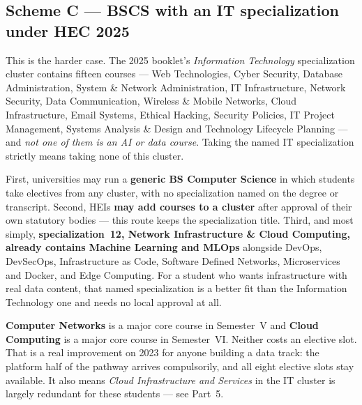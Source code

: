 \documentclass[11pt,a4paper,oneside]{report}
\begin{document}
\subsection{Scheme C --- BSCS with an IT specialization under HEC 2025}

This is the harder case. The 2025 booklet's \emph{Information Technology}
specialization cluster contains fifteen courses --- Web Technologies, Cyber
Security, Database Administration, System \& Network Administration, IT
Infrastructure, Network Security, Data Communication, Wireless \& Mobile
Networks, Cloud Infrastructure, Email Systems, Ethical Hacking, Security Policies,
IT Project Management, Systems Analysis \& Design and Technology Lifecycle
Planning --- and \emph{not one of them is an AI or data course}. Taking the named
IT specialization strictly means taking none of this cluster.

\begin{finding}
First, universities may run a \textbf{generic BS Computer Science} in which
students take electives from any cluster, with no specialization named on the
degree or transcript. Second, HEIs \textbf{may add courses to a cluster} after
approval of their own statutory bodies --- this route keeps the specialization
title. Third, and most simply, \textbf{specialization~12, Network Infrastructure
\& Cloud Computing, already contains Machine Learning and MLOps} alongside DevOps,
DevSecOps, Infrastructure as Code, Software Defined Networks, Microservices and
Docker, and Edge Computing. For a student who wants infrastructure with real data
content, that named specialization is a better fit than the Information Technology
one and needs no local approval at all.
\end{finding}

\begin{notebox}
\textbf{Computer Networks} is a major core course in Semester~V and \textbf{Cloud
Computing} is a major core course in Semester~VI. Neither costs an elective slot.
That is a real improvement on 2023 for anyone building a data track: the platform
half of the pathway arrives compulsorily, and all eight elective slots stay
available. It also means \emph{Cloud Infrastructure and Services} in the IT
cluster is largely redundant for these students --- see Part~5.
\end{notebox}
\end{document}
